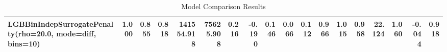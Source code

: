 \documentclass[11pt]{article}
\theoremstyle{plain}
\theoremstyle{definition}
\newcommand{\1}{\mathbf{1}}
\begin{document}
\begin{table}[htbp]
{\begin{tabular}{lrrrrrrrrrrrrrrrrr}
LGBBinIndepSurrogatePenalty(rho=20.0, mode=diff, bins=10) & 1.000 & 0.855 & 0.818 & 141554.918 & 75625.908 & 0.216 & \textbf{-0.190} & \textbf{0.146} & \textbf{0.066} & 0.112 & \textbf{0.966} & 1.015 & \textbf{0.958} & 22.124 & \textbf{1.060} & \textbf{-0.044} & \textbf{0.918} \\
\bottomrule
\end{tabular}
     }
    \caption{Model Comparison Results}
    \label{tab:model_comparison}
\end{table}

\newpage


\end{document}
